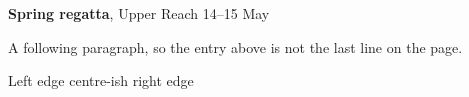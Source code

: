 \documentclass{article}
\begin{document}
\textbf{Spring regatta}, Upper Reach \hfill 14--15 May

A following paragraph, so the entry above is not the last line on the page.

Left edge \hfill centre-ish \hfill right edge
\end{document}

